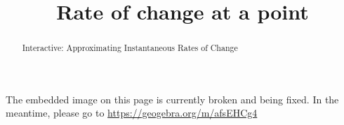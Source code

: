 \documentclass[handout]{ximera}
\title{Rate of change at a point}
\begin{document}
\begin{abstract} Interactive: Approximating Instantaneous Rates of Change
\end{abstract}

\maketitle

The embedded image on this page is currently broken and being fixed. In the meantime, please go to \url{https://geogebra.org/m/afsEHCg4}

\end{document}
